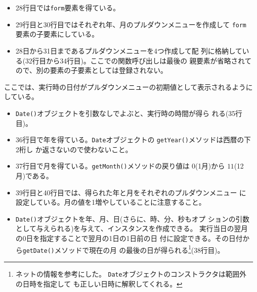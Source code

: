\begin{Exec}
\begin{itemize}
 \item 28行目では\texttt{form}要素を得ている。
 \item 29行目と30行目ではそれぞれ年、月のプルダウンメニューを作成して
       \texttt{form}要素の子要素にしている。
 \item 28日から31日まであるプルダウンメニューを4つ作成して配
       列に格納している(32行目から34行目)。ここでの関数呼び出しは最後の
       親要素が省略されてので、別の要素の子要素としては登録されない。
\end{itemize}
ここでは、実行時の日付がプルダウンメニューの初期値として表示されるように
 している。
\begin{itemize}
 \item \texttt{Date()}オブジェクトを引数なしでよぶと、実行時の時間が得ら
       れる(35行目)。
 \item 36行目で年を得ている。\texttt{Date}オブジェクトの
       \texttt{getYear()}メソッドは西暦の下2桁し
       か返さないので使わないこと。
 \item 37行目で月を得ている。\texttt{getMonth()}メソッドの戻り値は
       $0$(1月)から $11$(12月)である。
 \item 39行目と40行目では、得られた年と月をそれぞれのプルダウンメニュー
       に設定している。月の値を1増やしていることに注意すること。
 \item \texttt{Date()}オブジェクトを年、月、日(さらに、時、分、秒もオプ
       ションの引数として与えられる)を与えて、インスタンスを作成できる。
       実行当日の翌月の0日を指定することで翌月の1日の1日前の日
       付に設定できる。その日付から\texttt{getDate()}メソッドで現在の月
       の最後の日が得られる\footnote{ネットの情報を参考にした。
       \texttt{Date}オブジェクトのコンストラクタは範囲外の日時を指定して
       も正しい日時に解釈してくれる。}(38行目)。
       

\end{itemize}
\end{Exec}
